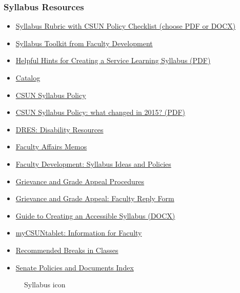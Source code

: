 \documentclass[
  letterpaper,
  DIV=11,
  numbers=noendperiod]{scrartcl}
\makeatletter
\providecommand{\tightlist}{%
  \setlength{\itemsep}{0pt}\setlength{\parskip}{0pt}}\usepackage{longtable,booktabs,array}
\newcommand*\pandocbounded[1]{%
  \sbox\pandoc@box{#1}%
  \Gscale@div\@tempa{\textheight}{\dimexpr\ht\pandoc@box+\dp\pandoc@box\relax}%
  \Gscale@div\@tempb{\linewidth}{\wd\pandoc@box}%
  \ifdim\@tempb\p@<\@tempa\p@\let\@tempa\@tempb\fi%
  \ifdim\@tempa\p@<\p@\scalebox{\@tempa}{\usebox\pandoc@box}%
  \else\usebox{\pandoc@box}%
  \fi%
}
\makeatother
\begin{document}
\subsubsection{Syllabus Resources}\label{syllabus-resources}

\begin{itemize}
\tightlist
\item
  \href{http://live-csu-northridge.pantheonsite.io}{Syllabus Rubric with
  CSUN Policy Checklist (choose PDF or DOCX)}
\item
  \href{https://www.csun.edu}{Syllabus Toolkit from Faculty Development}
\item
  \href{http://live-csu-northridge.pantheonsite.io}{Helpful Hints for
  Creating a Service Learning Syllabus (PDF)}
\item
  \href{https://catalog.csun.edu}{Catalog}
\item
  \href{https://catalog.csun.edu}{CSUN Syllabus Policy}
\item
  \href{http://live-csu-northridge.pantheonsite.io}{CSUN Syllabus
  Policy: what changed in 2015? (PDF)}
\item
  \href{https://www.csun.edu}{DRES: Disability Resources}
\item
  \href{https://www.csun.edu}{Faculty Affairs Memos}
\item
  \href{https://www.csun.edu}{Faculty Development: Syllabus Ideas and
  Policies}
\item
  \href{https://www.csun.edu}{Grievance and Grade Appeal Procedures}
\item
  \href{http://live-csu-northridge.pantheonsite.io}{Grievance and Grade
  Appeal: Faculty Reply Form}
\item
  \href{http://live-csu-northridge.pantheonsite.io}{Guide to Creating an
  Accessible Syllabus (DOCX)}
\item
  \href{https://www.csun.edu}{myCSUNtablet: Information for Faculty}
\item
  \href{http://live-csu-northridge.pantheonsite.io}{Recommended Breaks
  in Classes}
\item
  \href{https://www.csun.edu}{Senate Policies and Documents Index}
\end{itemize}

\begin{figure}[H]

{\centering \pandocbounded{\texttt{[image: \\\#.pdf]}}

}

\caption{Syllabus icon}

\end{figure}%
\end{document}
